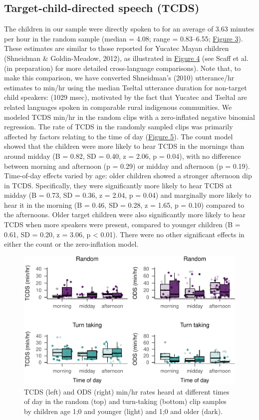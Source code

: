 \documentclass[floatsintext,man]{apa6}
\theoremstyle{definition}
\theoremstyle{definition}
\theoremstyle{definition}
\theoremstyle{remark}
\begin{document}
\subsection{Target-child-directed speech
(TCDS)}\label{target-child-directed-speech-tcds}

The children in our sample were directly spoken to for an average of
3.63 minutes per hour in the random sample (median = 4.08; range =
0.83--6.55; \protect\hyperlink{fig3}{Figure 3}). These estimates are
similar to those reported for Yucatec Mayan children (Shneidman \&
Goldin-Meadow, 2012), as illustrated in \protect\hyperlink{fig4}{Figure
4} (see Scaff et al. (in preparation) for more detailed cross-language
comparisons). Note that, to make this comparison, we have converted
Shneidman's (2010) utterance/hr estimates to min/hr using the median
Tseltal utterance duration for non-target child speakers: (1029 msec),
motivated by the fact that Yucatec and Tseltal are related languages
spoken in comparable rural indigenous communities. We modeled TCDS
min/hr in the random clips with a zero-inflated negative binomial
regression. The rate of TCDS in the randomly sampled clips was primarily
affected by factors relating to the time of day
(\protect\hyperlink{fig5}{Figure 5}). The count model showed that the
children were more likely to hear TCDS in the mornings than around
midday (B = 0.82, SD = 0.40, z = 2.06, p = 0.04), with no difference
between morning and afternoon (p = 0.29) or midday and afternoon (p =
0.19). Time-of-day effects varied by age: older children showed a
stronger afternoon dip in TCDS. Specifically, they were significantly
more likely to hear TCDS at midday (B = 0.73, SD = 0.36, z = 2.04, p =
0.04) and marginally more likely to hear it in the morning (B = 0.46, SD
= 0.28, z = 1.65, p = 0.10) compared to the afternoons. Older target
children were also significantly more likely to hear TCDS when more
speakers were present, compared to younger children (B = 0.61, SD =
0.20, z = 3.06, p \textless{} 0.01). There were no other significant
effects in either the count or the zero-inflation model.

\begin{figure}
\centering
\includegraphics{Tseltal-CLE_files/figure-latex/fig5-1.pdf}
\caption{\label{fig:fig5}TCDS (left) and ODS (right) min/hr rates heard at
different times of day in the random (top) and turn-taking (bottom) clip
samples by children age 1;0 and younger (light) and 1;0 and older
(dark).}
\end{figure}
\end{document}
